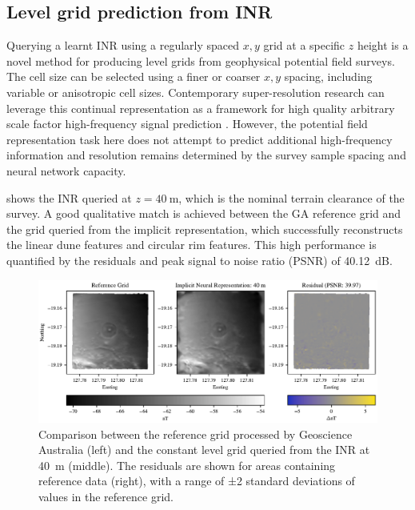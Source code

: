 \documentclass[manuscript.tex]{subfiles}
\begin{document}
\subsection{Level grid prediction from INR}
Querying a learnt INR using a regularly spaced \(x,y\) grid at a specific \(z\) height is a novel method for producing level grids from geophysical potential field surveys.
The cell size can be selected using a finer or coarser \(x,y\) spacing, including variable or anisotropic cell sizes.
Contemporary super-resolution research can leverage this continual representation as a framework for high quality arbitrary scale factor high-frequency signal prediction \parencite[e.g][]{chenLearningContinuousImage2021}.
However, the potential field representation task here does not attempt to predict additional high-frequency information and resolution remains determined by the survey sample spacing and neural network capacity.

 shows the INR queried at \(z=\SI{40}{\m}\), which is the nominal terrain clearance of the survey.
A good qualitative match is achieved between the GA reference grid and the grid queried from the implicit representation, which successfully reconstructs the linear dune features and circular rim features.
This high performance is quantified by the residuals and peak signal to noise ratio (PSNR) of \SI{40.12}{\dB}.

\begin{figure}[hbt]
    \centering{}
    \includegraphics[width=1.0\linewidth]{fig/p3/P864_grid_comparison_40m.pdf}
    \caption[Grid prediction at the nominal altitude]{Comparison between the reference grid processed by Geoscience Australia (left) and the constant level grid queried from the INR at \SI{40}{\m} (middle). The residuals are shown for areas containing reference data (right), with a range of ±2 standard deviations of values in the reference grid.}
    \label{fig:grid}
\end{figure}
\end{document}
